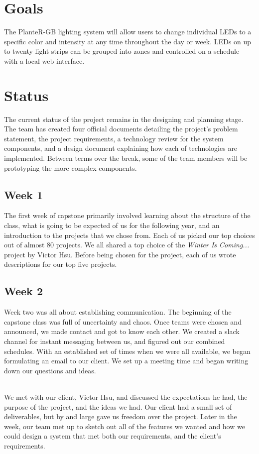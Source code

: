 \documentclass[onecolumn, draftclsnofoot,10pt, compsoc]{IEEEtran}
\begin{document}
	\section{Goals}
	The PlanteR-GB lighting system will allow users to change individual LEDs to a specific color and intensity at any time throughout the day or week.
	LEDs on up to twenty light strips can be grouped into zones and controlled on a schedule with a local web interface.

	\section{Status}
	The current status of the project remains in the designing and planning stage.  The team has created four official documents detailing the project's problem statement, the project requirements,
	a technology review for the system components, and a design document explaining how each of technologies are implemented. Between terms over the break, some of the team members will be prototyping
	the more complex components.

		\subsection{Week 1}
		The first week of capstone primarily involved learning about the structure of the class, what is going to be expected of us for the following year, and an introduction to the projects that we chose from.
		Each of us picked our top choices out of almost 80 projects. We all shared a top choice of the \textit{Winter Is Coming...} project by Victor Hsu.
		Before being chosen for the project, each of us wrote descriptions for our top five projects.

		\subsection{Week 2}
		Week two was all about establishing communication. The beginning of the capstone class was full of uncertainty and chaos.
		Once teams were chosen and announced, we made contact and got to know each other. We created a slack channel for instant messaging between us, and figured out our combined schedules.
		With an established set of times when we were all available, we began formulating an email to our client. We set up a meeting time and began writing down our questions and ideas.

		\noindent \\We met with our client, Victor Hsu, and discussed the expectations he had, the purpose of the project, and the ideas we had.
		Our client had a small set of deliverables, but by and large gave us freedom over the project.
		Later in the week, our team met up to sketch out all of the features we wanted and how we could design a system that met both our requirements, and the client's requirements.
\end{document}
